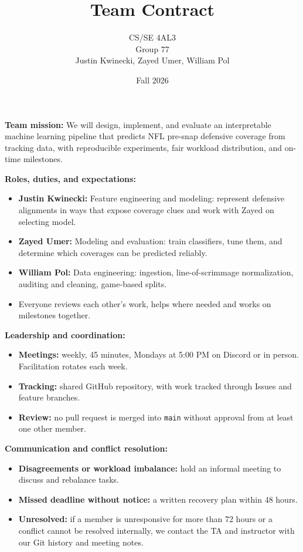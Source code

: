 \documentclass[12pt]{article}
\title{\vspace{-1.5em}\textbf{Team Contract}}
\author{CS/SE 4AL3 \\ Group 77 \\ Justin Kwinecki, Zayed Umer, William Pol}
\date{Fall 2026}
\begin{document}
\maketitle

\textbf{Team mission:} We will design, implement, and evaluate an interpretable machine learning pipeline that predicts NFL pre-snap defensive coverage from tracking data, with reproducible experiments, fair workload distribution, and on-time milestones.

\textbf{Roles, duties, and expectations:}
\begin{itemize}
  \item \textbf{Justin Kwinecki:} Feature engineering and modeling: represent defensive alignments in ways that expose coverage clues and work with Zayed on selecting model.
  \item \textbf{Zayed Umer:} Modeling and evaluation: train classifiers, tune them, and determine which coverages can be predicted reliably.
  \item \textbf{William Pol:} Data engineering: ingestion, line-of-scrimmage normalization, auditing and cleaning, game-based splits.
  \item Everyone reviews each other's work, helps where needed and works on milestones together.
\end{itemize}

\textbf{Leadership and coordination:}
\begin{itemize}
  \item \textbf{Meetings:} weekly, 45 minutes, Mondays at 5:00 PM on Discord or in person. Facilitation rotates each week.
  \item \textbf{Tracking:} shared GitHub repository, with work tracked through Issues and feature branches.
  \item \textbf{Review:} no pull request is merged into \texttt{main} without approval from at least one other member.
\end{itemize}

\textbf{Communication and conflict resolution:}
\begin{itemize}
  \item \textbf{Disagreements or workload imbalance:} hold an informal meeting to discuss and rebalance tasks.
  \item \textbf{Missed deadline without notice:} a written recovery plan within 48 hours.
  \item \textbf{Unresolved:} if a member is unresponsive for more than 72 hours or a conflict cannot be resolved internally, we contact the TA and instructor with our Git history and meeting notes.
\end{itemize}
\end{document}
